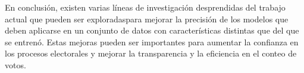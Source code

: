 En conclusión, existen varias líneas de investigación desprendidas del trabajo actual que pueden ser exploradaspara
mejorar la precisión de los modelos que deben aplicarse en un conjunto de datos con características distintas que del
que se entrenó. Estas mejoras pueden ser importantes para aumentar la confianza en los procesos electorales y mejorar
la transparencia y la eficiencia en el conteo de votos.
